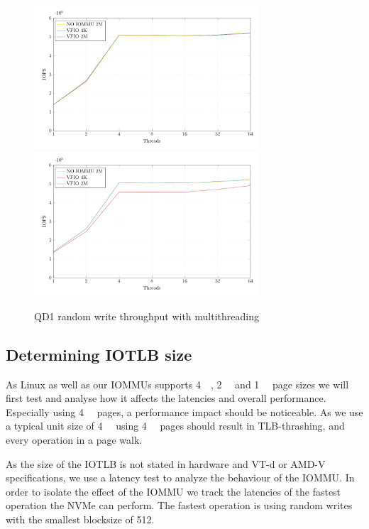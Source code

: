 \begin{figure}[H]
  \centering
   {\includegraphics[width=0.75\textwidth]{figures/qd1tn_1page}}
   {\includegraphics[width=0.75\textwidth]{figures/qd1tn_512page}}
  \caption{QD1 random write throughput with multithreading}
  \label{fig:qd1tn_4kib}
\end{figure}

\subsection{Determining IOTLB size}
As Linux as well as our IOMMUs supports \qty{4}{\kibi\byte}, \qty{2}{\mebi\byte} and \qty{1}{\gibi\byte} page sizes we will first test and analyse how it affects the latencies and overall performance. Especially using \qty{4}{\kibi\byte} pages, a performance impact should be noticeable. As we use a typical unit size of \qty{4}{\kibi\byte} using \qty{4}{\kibi\byte} pages should result in TLB-thrashing, and every operation in a page walk.

As the size of the IOTLB is not stated in hardware and VT-d or AMD-V specifications, we use a latency test to analyze the behaviour of the IOMMU.
In order to isolate the effect of the IOMMU we track the latencies of the fastest operation the NVMe can perform. The fastest operation is using random writes with the smallest blocksize of \qty{512}{\byte}.

